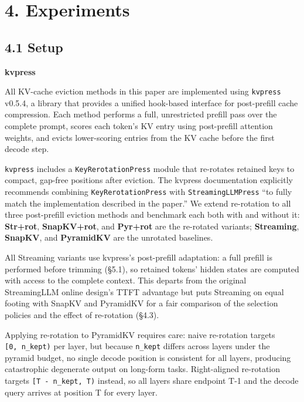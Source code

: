 \documentclass[10pt,letterpaper]{article}
\begin{document}
\hypertarget{main-experiments}{%
\section{4. Experiments}\label{main-experiments}}

\hypertarget{setup-1}{%
\subsection{4.1 Setup}\label{setup-1}}

\textbf{kvpress}

All KV-cache eviction methods in this paper are implemented using
\texttt{kvpress} v0.5.4, a library that provides a unified hook-based
interface for post-prefill cache compression. Each method performs a
full, unrestricted prefill pass over the complete prompt, scores each
token's KV entry using post-prefill attention weights, and evicts
lower-scoring entries from the KV cache before the first decode step.

\texttt{kvpress} includes a \texttt{KeyRerotationPress} module that
re-rotates retained keys to compact, gap-free positions after eviction.
The kvpress documentation explicitly recommends combining
\texttt{KeyRerotationPress} with \texttt{StreamingLLMPress} ``to fully
match the implementation described in the paper.'' We extend re-rotation
to all three post-prefill eviction methods and benchmark each both with
and without it: \textbf{Str+rot}, \textbf{SnapKV+rot}, and
\textbf{Pyr+rot} are the re-rotated variants; \textbf{Streaming},
\textbf{SnapKV}, and \textbf{PyramidKV} are the unrotated baselines.

All Streaming variants use kvpress's post-prefill adaptation: a full
prefill is performed before trimming (§5.1), so retained tokens' hidden
states are computed with access to the complete context. This departs
from the original StreamingLLM online design's TTFT advantage but puts
Streaming on equal footing with SnapKV and PyramidKV for a fair
comparison of the selection policies and the effect of re-rotation
(§4.3).

Applying re-rotation to PyramidKV requires care: naive re-rotation
targets \texttt{[0,~n\_kept)} per layer, but because \texttt{n\_kept}
differs across layers under the pyramid budget, no single decode
position is consistent for all layers, producing catastrophic degenerate
output on long-form tasks. Right-aligned re-rotation targets
\texttt{[T~-~n\_kept,~T)} instead, so all layers share endpoint T-1
and the decode query arrives at position T for every layer.
\end{document}
